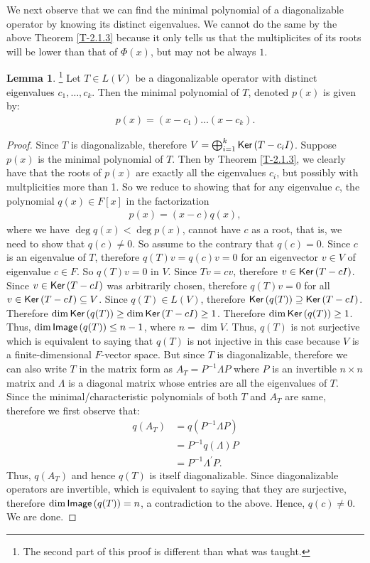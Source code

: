 \documentclass[letterpaper,11pt,twoside]{article}
\theoremstyle{definition}
\theoremstyle{definition}
\theoremstyle{definition}
\theoremstyle{definition}
\newtheorem{lemma}[proposition]{\textbf{Lemma}}
\theoremstyle{definition}
\theoremstyle{definition}
\theoremstyle{remark}
\theoremstyle{definition}
\newcommand{\Ker}[1]{{\fontfamily{lmss}\selectfont 
		\text{Ker}\left (#1\right )
}}
\newcommand{\Image}[1]{{\fontfamily{lmss}\selectfont 
		\text{Image}\left (#1\right )
}}
\begin{document}
    We next observe that we can find the minimal polynomial of a diagonalizable operator by knowing its distinct eigenvalues. We cannot do the same by the above Theorem \ref{T-2.1.3} because it only tells us that the multiplicites of its roots will be lower than that of $\Phi(x)$, but may not be always $1$.
    \begin{lemma}\label{L-2.1.4}\footnote{The second part of this proof is different than what was taught.}
    Let $T\in L(V)$ be a diagonalizable operator with distinct eigenvalues $c_1,\dots,c_k$. Then the minimal polynomial of $T$, denoted $p(x)$ is given by:
    \begin{align*}
        p(x) = (x-c_1)\dots (x-c_k).
    \end{align*}
    \end{lemma}
    \begin{proof}
        Since $T$ is diagonalizable, therefore $V = \bigoplus_{i=1}^k \Ker{T-c_iI}$. Suppose $p(x)$ is the minimal polynomial of $T$. Then by Theorem \ref{T-2.1.3}, we clearly have that the roots of $p(x)$ are exactly all the eigenvalues $c_i$, but possibly with multplicities more than 1. So we reduce to showing that for any eigenvalue $c$, the polynomial $q(x)\in F[x]$ in the factorization
        \begin{align*}
            p(x) = (x-c) q(x),
        \end{align*}
        where we have $\deg q(x) < \deg p(x)$, cannot have $c$ as a root, that is, we need to show that $q(c) \neq 0$. So assume to the contrary that $q(c) = 0$. Since $c$ is an eigenvalue of $T$, therefore $q(T)v = q(c)v = 0$ for an eigenvector $v\in V$ of eigenvalue $c\in F$. So $q(T)v = 0$ in $V$. Since $Tv = cv$, therefore $v\in \Ker{T-cI}$. Since $v\in \Ker{T-cI}$ was arbitrarily chosen, therefore $q(T)v = 0$ for all $v\in \Ker{T-cI} \subseteq V$. Since $q(T) \in L(V)$, therefore $\Ker{q(T)} \supseteq \Ker{T-cI}$. Therefore $\dim \Ker{q(T)} \ge \dim \Ker{T-cI} \ge 1$. Therefore $\dim \Ker{q(T)} \ge 1$. Thus, $\dim \Image{q(T)} \le n-1$, where $n=\dim V$. Thus, $q(T)$ is not surjective which is equivalent to saying that $q(T)$ is not injective in this case because $V$ is a finite-dimensional $F$-vector space. But since $T$ is diagonalizable, therefore we can also write $T$ in the matrix form as $A_T = P^{-1}\Lambda P$ where $P$ is an invertible $n\times n$ matrix and $\Lambda$ is a diagonal matrix whose entries are all the eigenvalues of $T$. Since the minimal/characteristic polynomials of both $T$ and $A_T$ are same, therefore we first observe that:
        \begin{align*}
            q(A_T) &= q(P^{-1}\Lambda P)\\
            &= P^{-1}q(\Lambda)P\\
            &= P^{-1}\Lambda^\prime P.
        \end{align*}
        Thus, $q(A_T)$ and hence $q(T)$ is itself diagonalizable. Since diagonalizable operators are invertible, which is equivalent to saying that they are surjective, therefore $\dim \Image{q(T)} = n$, a contradiction to the above. Hence, $q(c) \neq 0$. We are done.
    \end{proof}
\end{document}
